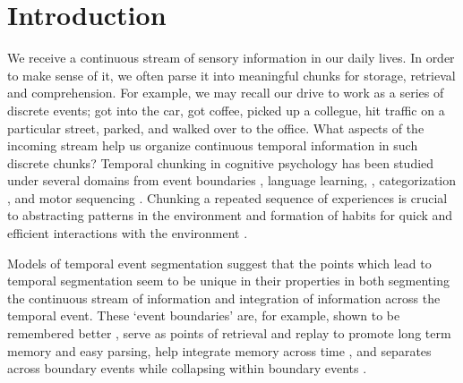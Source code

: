\section{Introduction}
We receive a continuous stream of sensory information in our daily lives. In order to make sense of it, we often parse it into meaningful chunks for storage, retrieval and comprehension. For example, we may recall our drive to work as a series of discrete events; got into the car, got coffee, picked up a collegue, hit traffic on a particular street, parked, and walked over to the office. What aspects of the incoming stream help us organize continuous temporal information in such discrete chunks? 
Temporal chunking in cognitive psychology has been studied under several domains from event boundaries \cite{clewett2019transcending, zacks2007event, rouhani2020reward,rouhani2018dissociable,dubrow2013influence,baldwin2008segmenting}, language learning, \cite{romberg2010statistical,knowlton1992intact}, categorization \cite{unger2022ready,gabay2015incidental}, and motor sequencing \cite{bera2021motor, tremblay2010movement, savalia2016unified,ostlund2009evidence}. Chunking a repeated sequence of experiences is crucial to abstracting patterns in the environment and formation of habits for quick and efficient interactions with the environment \cite{dezfouli2012habits, smith2016habit,dolan2013goals, dezfouli2014habits, gershman2010learning, botvinick2012hierarchical}. 

Models of temporal event segmentation suggest that the points which lead to temporal segmentation seem to be unique in their properties in both segmenting the continuous stream of information and integration of information across the temporal event. These `event boundaries' are, for example, shown to be remembered better \cite{swallow2009event,rouhani2018dissociable,rouhani2018dissociable, zacks2020event, radvansky2017event, heusser2018perceptual}, serve as points of retrieval \cite{michelmann2023evidence} and replay to promote long term memory \cite{hahamy2023human, sols2017event} and easy parsing, help integrate memory across time \cite{clewett2019transcending}, and separates across boundary events while collapsing within boundary events \cite{clewett2019transcending, lositsky2016neural,ezzyat2014similarity, brunec2018boundaries}. 

